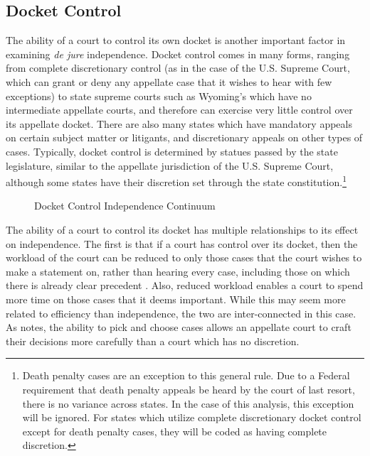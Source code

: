 \documentclass[12pt]{article}
\begin{document}
\subsection*{Docket Control}
The ability of a court to control its own docket is another important factor in examining \textit{de jure} independence.  Docket control comes in many forms, ranging from complete discretionary control (as in the case of the U.S. Supreme Court, which can grant or deny any appellate case that it wishes to hear with few exceptions) to state supreme courts such as Wyoming's which have no intermediate appellate courts, and therefore can exercise very little control over its appellate docket. There are also many states which have mandatory appeals on certain subject matter or litigants, and discretionary appeals on other types of cases.  Typically, docket control is determined by statues passed by the state legislature, similar to the appellate jurisdiction of the U.S. Supreme Court, although some states have their discretion set through the state constitution.\footnote{Death penalty cases are an exception to this general rule.  Due to a Federal requirement that death penalty appeals be heard by the court of last resort, there is no variance across states.  In the case of this analysis, this exception will be ignored.  For states which utilize complete discretionary docket control except for death penalty cases, they will be coded as having complete discretion.}

\begin{figure}[tbh]\centering\caption{Docket Control Independence Continuum}\label{docketcontinuum}
\end{figure}

The ability of a court to control its docket has multiple relationships to its effect on independence.  The first is that if a court has control over its docket, then the workload of the court can be reduced to only those cases that the court wishes to make a statement on, rather than hearing every case, including those on which there is already clear precedent \citep{Maltzman2000}.  Also, reduced workload enables a court to spend more time on those cases that it deems important.  While this may seem more related to efficiency than independence, the two are inter-connected in this case.  As \citet{Squire2008} notes, the ability to pick and choose cases allows an appellate court to craft their decisions more carefully than a court which has no discretion.
\end{document}
